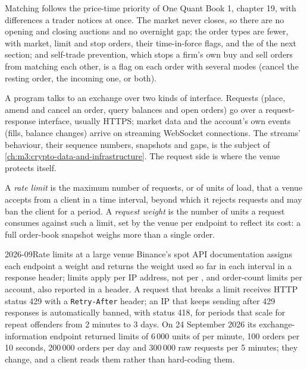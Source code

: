 Matching follows the price-time priority of One Quant Book 1, chapter 19, with differences a trader
notices at once. The market never closes, so there are no opening and closing auctions and no overnight
gap; the order types are fewer, with market, limit and stop orders, their time-in-force flags, and the
 of the next section; and self-trade prevention, which stops a firm's own buy and sell
orders from matching each other, is a flag on each order with several modes (cancel the resting order,
the incoming one, or both).

A program talks to an exchange over two kinds of interface. Requests (place, amend and cancel an order,
query balances and open orders) go over a request-response interface, usually HTTPS; market data and
the account's own events (fills, balance changes) arrive on streaming WebSocket connections. The
streams' behaviour, their sequence numbers, snapshots and gaps, is the subject of
\cref{ch:m3:crypto-data-and-infrastructure}. The request side is where the venue protects itself.

\begin{definition}\label{def:m3:centralised-exchanges:ratelimit}
A \emph{rate limit} is the maximum number of requests, or of units of load, that a
venue accepts from a client in a time interval, beyond which it rejects requests and may ban the client
for a period. A \emph{request weight} is the number of units a request consumes
against such a limit, set by the venue per endpoint to reflect its cost: a full order-book snapshot
weighs more than a single order.
\end{definition}

\begin{dated}{2026-09}{Rate limits at a large venue}\label{dat:m3:centralised-exchanges:limits}
Binance's spot API documentation assigns each endpoint a weight and returns the weight used so far in
each interval in a response header; limits apply per IP address, not per , and order-count
limits per account, also reported in a header. A request that breaks a limit receives HTTP status 429
with a \texttt{Retry-After} header; an IP that keeps sending after 429 responses is automatically
banned, with status 418, for periods that scale for repeat offenders from 2 minutes to 3 days. On 24
September 2026 its exchange-information endpoint returned limits of 6\,000 units of  per
minute, 100 orders per 10 seconds, 200\,000 orders per day and 300\,000 raw requests per 5 minutes;
they change, and a client reads them rather than hard-coding them.
\end{dated}

